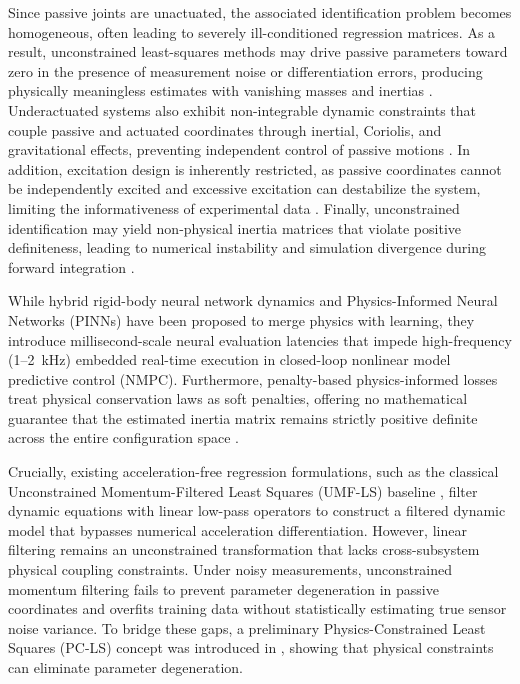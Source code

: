\documentclass[lettersize,journal]{IEEEtran}
\begin{document}
Since passive joints are unactuated, the associated identification problem becomes homogeneous, often leading to severely ill-conditioned regression matrices. As a result, unconstrained least-squares methods may drive passive parameters toward zero in the presence of measurement noise or differentiation errors, producing physically meaningless estimates with vanishing masses and inertias \cite{Asker2024}. Underactuated systems also exhibit non-integrable dynamic constraints that couple passive and actuated coordinates through inertial, Coriolis, and gravitational effects, preventing independent control of passive motions \cite{Fantoni2002}. In addition, excitation design is inherently restricted, as passive coordinates cannot be independently excited and excessive excitation can destabilize the system, limiting the informativeness of experimental data \cite{Swevers2007, AguilarSierra2014}. Finally, unconstrained identification may yield non-physical inertia matrices that violate positive definiteness, leading to numerical instability and simulation divergence during forward integration \cite{Traversaro2016, Mehta2023}.

While hybrid rigid-body neural network dynamics \cite{Lutter2019, Hwangbo2019, Lee2024} and Physics-Informed Neural Networks (PINNs) \cite{Raissi2019, Karniadakis2021} have been proposed to merge physics with learning, they introduce millisecond-scale neural evaluation latencies that impede high-frequency (1--2~kHz) embedded real-time execution in closed-loop nonlinear model predictive control (NMPC). Furthermore, penalty-based physics-informed losses treat physical conservation laws as soft penalties, offering no mathematical guarantee that the estimated inertia matrix remains strictly positive definite across the entire configuration space \cite{Mehta2023, Schillinger2024}.

Crucially, existing acceleration-free regression formulations, such as the classical Unconstrained Momentum-Filtered Least Squares (UMF-LS) baseline \cite{GarciaAlarcon2012, AguilarSierra2014}, filter dynamic equations with linear low-pass operators to construct a filtered dynamic model that bypasses numerical acceleration differentiation. However, linear filtering remains an unconstrained transformation that lacks cross-subsystem physical coupling constraints. Under noisy measurements, unconstrained momentum filtering fails to prevent parameter degeneration in passive coordinates and overfits training data without statistically estimating true sensor noise variance. To bridge these gaps, a preliminary Physics-Constrained Least Squares (PC-LS) concept was introduced in \cite{Asker2024}, showing that physical constraints can eliminate parameter degeneration.
\end{document}
